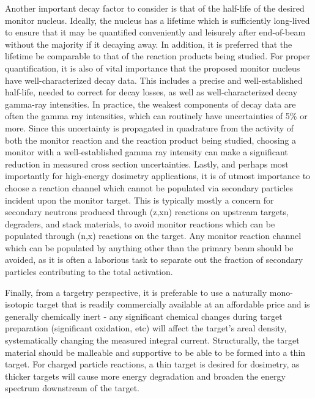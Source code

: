 \documentclass[3p]{elsarticle}
\begin{document}
Another important decay factor to consider is that of the half-life of the desired monitor nucleus.
Ideally, the nucleus has a lifetime which is sufficiently long-lived to ensure that it may be quantified  conveniently and leisurely after end-of-beam without the majority if it decaying away.
In addition, it is preferred that the lifetime be comparable to that of the reaction products being studied. 
For proper quantification, it is also of vital importance that the proposed monitor nucleus have well-characterized decay data.
This includes a precise and well-established half-life,  needed to  correct for decay losses, as well as well-characterized decay gamma-ray intensities.
In practice, the weakest components of decay data are often the gamma ray intensities, which can routinely have uncertainties of 5\% or more.
Since this uncertainty is propagated in quadrature from the activity of both the monitor reaction and the reaction product being studied, choosing a monitor with a well-established gamma ray intensity can make a significant reduction in measured cross section uncertainties.
Lastly, and perhaps most importantly for high-energy dosimetry applications, it is  of utmost importance to choose a reaction channel which cannot be populated via secondary particles incident upon the monitor target.
This is typically mostly a concern for secondary neutrons produced through (z,xn) reactions on upstream targets, degraders, and stack materials, to avoid monitor reactions which can be populated through (n,x) reactions on the target.
Any monitor reaction channel which can be populated by anything other than the primary beam should be avoided, as it is often a laborious task to separate out the fraction of secondary particles contributing to the total activation.  



Finally, from a targetry  perspective, it is preferable to use a naturally mono-isotopic target that is readily commercially available at an affordable price and is generally chemically inert - any significant chemical changes during target preparation (significant oxidation, etc) will affect the target's areal density, systematically changing the measured integral current. 
Structurally, the target material should be malleable and supportive to be able to be formed into a thin target.
For charged particle reactions, a thin target is desired for dosimetry, as thicker targets will cause more energy degradation and broaden the energy spectrum downstream of the target.
\end{document}

